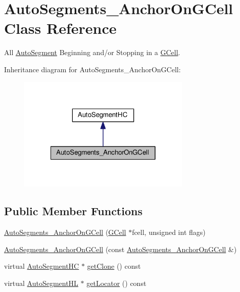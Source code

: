 \hypertarget{classKatabatic_1_1AutoSegments__AnchorOnGCell}{\section{Auto\-Segments\-\_\-\-Anchor\-On\-G\-Cell Class Reference}
\label{classKatabatic_1_1AutoSegments__AnchorOnGCell}
}


All \hyperlink{classKatabatic_1_1AutoSegment}{Auto\-Segment} Beginning and/or Stopping in a \hyperlink{classKatabatic_1_1GCell}{G\-Cell}.  




Inheritance diagram for Auto\-Segments\-\_\-\-Anchor\-On\-G\-Cell\-:\nopagebreak
\begin{figure}[H]
\begin{center}
\leavevmode
\includegraphics[width=234pt]{classKatabatic_1_1AutoSegments__AnchorOnGCell__inherit__graph}
\end{center}
\end{figure}
\subsection*{Public Member Functions}
\begin{DoxyCompactItemize}
\item 
\hyperlink{classKatabatic_1_1AutoSegments__AnchorOnGCell_a41a8dace22db3bdd8ecbf1850344f885}{Auto\-Segments\-\_\-\-Anchor\-On\-G\-Cell} (\hyperlink{classKatabatic_1_1GCell}{G\-Cell} $\ast$fcell, unsigned int flags)
\item 
\hyperlink{classKatabatic_1_1AutoSegments__AnchorOnGCell_a4597cd793ef7f6a5be546b24863f99e8}{Auto\-Segments\-\_\-\-Anchor\-On\-G\-Cell} (const \hyperlink{classKatabatic_1_1AutoSegments__AnchorOnGCell}{Auto\-Segments\-\_\-\-Anchor\-On\-G\-Cell} \&)
\item 
virtual \hyperlink{namespaceKatabatic_acb3628dc7705fefe38a665cfe43efa6e}{Auto\-Segment\-H\-C} $\ast$ \hyperlink{classKatabatic_1_1AutoSegments__AnchorOnGCell_a75133d1052f09538e168f7f4f717c740}{get\-Clone} () const 
\item 
virtual \hyperlink{namespaceKatabatic_a40ef13471fd0e797b75d3c436813fe65}{Auto\-Segment\-H\-L} $\ast$ \hyperlink{classKatabatic_1_1AutoSegments__AnchorOnGCell_aa0952035e19936102da08deed796eed9}{get\-Locator} () const 
\end{DoxyCompactItemize}


